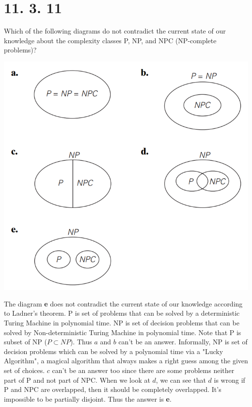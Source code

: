 \documentclass{article}
\begin{document}
\section{11. 3. 11}
Which of the following diagrams do not contradict the current state of our
knowledge about the complexity classes P, NP, and NPC (NP-complete problems)?
\begin{center}
\includegraphics[scale = 0.5]{Picture.png} \\
\end{center}
The diagram \textbf{e} does not contradict the current state of our knowledge according to Ladner's theorem. P is set of problems that can be solved by a deterministic Turing Machine in polynomial time. NP is set of decision problems that can be solved by Non-deterministic Turing Machine in polynomial time. Note that P is subset of NP ($P \subset NP$). Thus $a$ and $b$ can't be an answer. Informally, NP is set of decision problems which can be solved by a polynomial time via a "Lucky Algorithm", a magical algorithm that always makes a right guess among the given set of choices. $c$ can't be an answer too since there are some problems neither part of P and not part of NPC. When we look at $d$, we can see that $d$ is wrong if P and NPC are overlapped, then it should be completely overlapped. It's impossible to be partially disjoint. Thus the answer is \textbf{e}.
\end{document}
